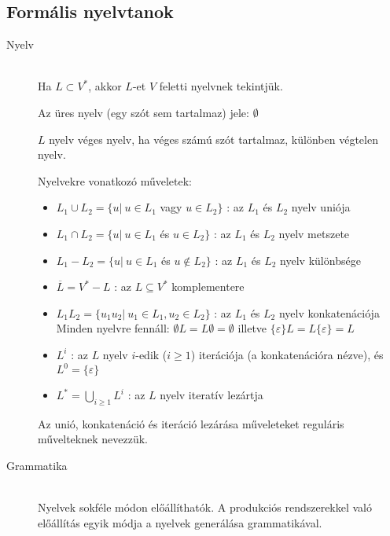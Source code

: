 \documentclass[margin=0px]{article}
\begin{document}
				\subsection{Formális nyelvtanok}
				\begin{description}
					\item[Nyelv] \hfill \\
						Ha $L \subset V^*$, akkor $L$-et $V$ feletti nyelvnek tekintjük.
						
						Az üres nyelv (egy szót sem tartalmaz) jele: $\emptyset$
						
						$L$ nyelv véges nyelv, ha véges számú szót tartalmaz, különben végtelen nyelv.
						
						Nyelvekre vonatkozó műveletek:
						\begin{itemize}
							\item $ L_1 \cup L_2 = \{u | \ u \in L_1 $ vagy $ u \in L_2\}$ : az $L_1$ és $L_2$ nyelv uniója
							\item $ L_1 \cap L_2 = \{u | \ u \in L_1 $ és $ u \in L_2\}$ : az $L_1$ és $L_2$ nyelv metszete
							\item $ L_1 - L_2 = \{u | \ u \in L_1 $ és $ u \notin L_2\}$ : az $L_1$ és $L_2$ nyelv különbsége
							\item $\overline{L} = V^* - L$ : az $L \subseteq V^*$ komplementere
							\item $L_1L_2 = \{u_1u_2 | \ u_1 \in L_1, u_2 \in L_2\}$ : az $L_1$ és $L_2$ nyelv konkatenációja\\
							Minden nyelvre fennáll: $\emptyset L = L \emptyset = \emptyset$ illetve $\{\varepsilon\}L = L\{\varepsilon\} = L$
							\item $L^i$ : az $L$ nyelv $i$-edik ($i \geq 1$) iterációja (a konkatenációra nézve), és $L^0 = \{\varepsilon\}$
							\item $ L^* = \bigcup\limits_{i\geq1} L^i$ : az $L$ nyelv iteratív lezártja 
						\end{itemize}
						Az unió, konkatenáció és iteráció lezárása műveleteket reguláris művelteknek nevezzük.
					\item[Grammatika] \hfill \\
						Nyelvek sokféle módon előállíthatók. A produkciós rendszerekkel való előállítás egyik módja a nyelvek generálása grammatikával.
						

\end{description}
\end{document}
